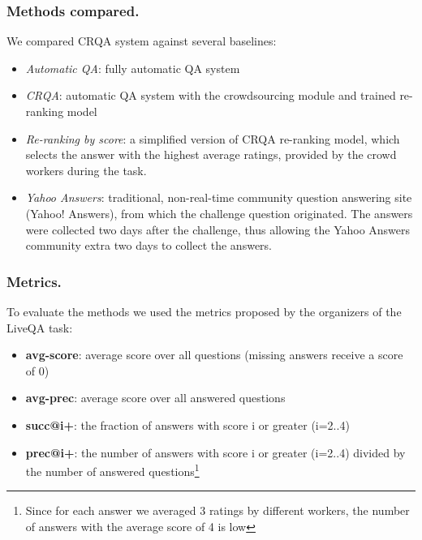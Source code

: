 \documentclass[letterpaper]{article}
\begin{document}
\subsubsection{Methods compared.}
We compared CRQA system against several baselines:
\begin{itemize}
\item \textit{Automatic QA}: fully automatic QA system
\item \textit{CRQA}: automatic QA system with the crowdsourcing module and trained re-ranking model
\item \textit{Re-ranking by score}: a simplified version of CRQA re-ranking model, which selects the answer with the highest average ratings, provided by the crowd workers during the task.
\item \textit{Yahoo Answers}: traditional, non-real-time community question answering site (Yahoo! Answers), from which the challenge question originated.
The answers were collected two days after the challenge, thus allowing the Yahoo Answers community extra two days to collect the answers.
\end{itemize}

\subsubsection{Metrics.}
To evaluate the methods we used the metrics proposed by the organizers of the LiveQA task:
\begin{itemize}
\item \textbf{avg-score}: average score over all questions (missing answers receive a score of 0)
\item \textbf{avg-prec}: average score over all answered questions
\item \textbf{succ@i+}: the fraction of answers with score i or greater (i=2..4)
\item \textbf{prec@i+}: the number of answers with score i or greater (i=2..4) divided by the number of answered questions\footnote{Since for each answer we averaged 3 ratings by different workers, the number of answers with the average score of 4 is low}
\end{itemize}
\end{document}
